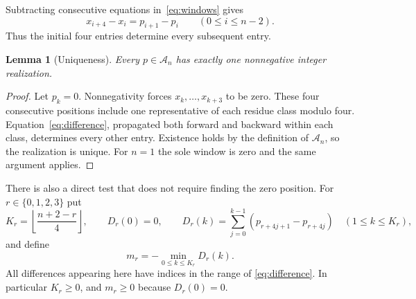 \documentclass[11pt]{article}
\newtheorem{lemma}[theorem]{Lemma}
\theoremstyle{definition}
\theoremstyle{remark}
\newcommand{\calA}{\mathcal A}
\begin{document}
Subtracting consecutive equations in~\eqref{eq:windows} gives
\begin{equation}
 x_{i+4}-x_i=p_{i+1}-p_i\qquad(0\leq i\leq n-2).
 \label{eq:difference}
\end{equation}
Thus the initial four entries determine every subsequent entry.

\begin{lemma}[Uniqueness]
\label{lem:unique}
Every $p\in\calA_n$ has exactly one nonnegative integer realization.
\end{lemma}
\begin{proof}
Let $p_k=0$. Nonnegativity forces $x_k,\ldots,x_{k+3}$ to be zero.
These four consecutive positions include one representative of each residue
class modulo four. Equation~\eqref{eq:difference}, propagated both forward
and backward within each class, determines every other entry. Existence
holds by the definition of $\calA_n$, so the realization is unique.
For $n=1$ the sole window is zero and the same argument applies.
\end{proof}

There is also a direct test that does not require finding the zero position.
For $r\in\{0,1,2,3\}$ put
\[
 K_r=\left\lfloor\frac{n+2-r}{4}\right\rfloor,\qquad
 D_r(0)=0,\qquad
 D_r(k)=\sum_{j=0}^{k-1}(p_{r+4j+1}-p_{r+4j})\quad(1\leq k\leq K_r),
\]
and define
\begin{equation}
 m_r=-\min_{0\leq k\leq K_r}D_r(k).
 \label{eq:minimum}
\end{equation}
All differences appearing here have indices in the range of
\eqref{eq:difference}. In particular $K_r\geq0$, and $m_r\geq0$ because
$D_r(0)=0$.
\end{document}
